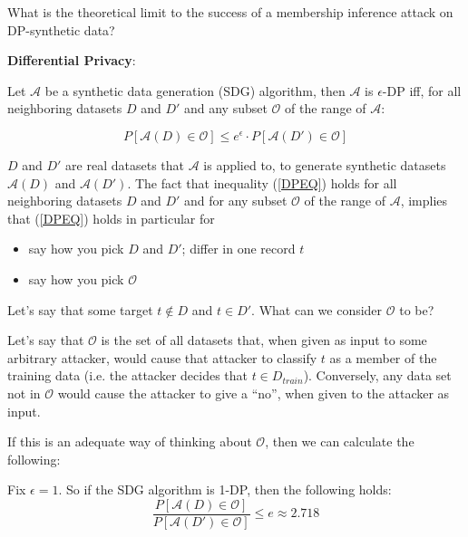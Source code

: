 \documentclass{article}
\begin{document}
What is the theoretical limit to the success of a membership inference attack on DP-synthetic data?


\vspace{20pt}
\textbf{Differential Privacy}: 

Let $\mathcal{A}$ be a synthetic data generation (SDG) algorithm, then  $\mathcal{A}$ is $\epsilon$-DP iff, for all neighboring datasets $D$ and $D'$ and any subset $\mathcal{O}$ of the range of $\mathcal{A}$:

\begin{equation}\label{DPEQ}
    P[\mathcal{A}(D) \in \mathcal{O}] \leq e^\epsilon \cdot P[\mathcal{A}(D') \in \mathcal{O}]
\end{equation}

$D$ and $D'$ are real datasets that $\mathcal{A}$ is applied to, to generate synthetic datasets $\mathcal{A}(D)$ and $\mathcal{A}(D')$. The fact that inequality (\ref{DPEQ}) holds for all neighboring datasets $D$ and $D'$ and for any subset $\mathcal{O}$ of the range of $\mathcal{A}$, implies that (\ref{DPEQ}) holds in particular for 
\begin{itemize}
\item say how you pick $D$ and $D'$; differ in one record $t$
\item say how you pick $\mathcal{O}$
\end{itemize}

Let's say that some target $t \notin D$ and $t \in D'$. What can we consider $\mathcal{O}$ to be?

Let's say that $\mathcal{O}$ is the set of all datasets that, when given as input to some arbitrary attacker, would cause that attacker to classify $t$ as a member of the training data (i.e. the attacker decides that $t \in D_{train}$). Conversely, any data set not in $\mathcal{O}$ would cause the attacker to give a ``no'', when given to the attacker as input.

If this is an adequate way of thinking about $\mathcal{O}$, then we can calculate the following:

\vspace{20pt}
Fix $\epsilon = 1$. So if the SDG algorithm is 1-DP, then the following holds:
\begin{equation}
    \frac{P[\mathcal{A}(D) \in \mathcal{O}]}{P[\mathcal{A}(D') \in \mathcal{O}]} \leq e \approx 2.718
\end{equation}
\end{document}
